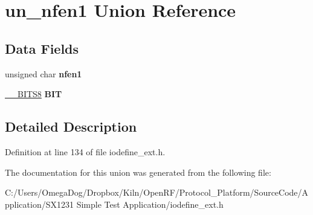 \hypertarget{unionun__nfen1}{\section{un\-\_\-nfen1 Union Reference}
\label{unionun__nfen1}
}
\subsection*{Data Fields}
\begin{DoxyCompactItemize}
\item 
\hypertarget{unionun__nfen1_ae870ad788ce2c70872d9e19d9aa41519}{unsigned char {\bfseries nfen1}}\label{unionun__nfen1_ae870ad788ce2c70872d9e19d9aa41519}

\item 
\hypertarget{unionun__nfen1_a43225f3457415f3f106d68beafa2e6cd}{\hyperlink{struct_____b_i_t_s8}{\-\_\-\-\_\-\-B\-I\-T\-S8} {\bfseries B\-I\-T}}\label{unionun__nfen1_a43225f3457415f3f106d68beafa2e6cd}

\end{DoxyCompactItemize}


\subsection{Detailed Description}


Definition at line 134 of file iodefine\-\_\-ext.\-h.



The documentation for this union was generated from the following file\-:\begin{DoxyCompactItemize}
\item 
C\-:/\-Users/\-Omega\-Dog/\-Dropbox/\-Kiln/\-Open\-R\-F/\-Protocol\-\_\-\-Platform/\-Source\-Code/\-Application/\-S\-X1231 Simple Test Application/iodefine\-\_\-ext.\-h\end{DoxyCompactItemize}
